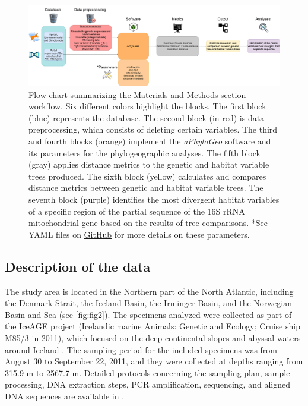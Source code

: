 \begin{figure}[htbp]
    \centering
    \includegraphics[width=\textwidth]{diagram.drawio.png}
    \caption{Flow chart summarizing the Materials and Methods section workflow. Six different colors highlight the blocks. The first block (blue) represents the database. The second block (in red) is data preprocessing, which consists of deleting certain variables. The third and fourth blocks (orange) implement the \textit{aPhyloGeo} software and its parameters for the phylogeographic analyses. The fifth block (gray) applies distance metrics to the genetic and habitat variable trees produced. The sixth block (yellow) calculates and compares distance metrics between genetic and habitat variable trees. The seventh block (purple) identifies the most divergent habitat variables of a specific region of the partial sequence of the 16S rRNA mitochondrial gene based on the results of tree comparisons. *See YAML files on \href{https://github.com/tahiri-lab/aPhyloGeo}{GitHub} for more details on these parameters. \label{fig:fig1}}
\end{figure}

\subsection{Description of the data}
The study area is located in the Northern part of the North Atlantic, including the Denmark Strait, the Iceland Basin, the Irminger Basin, and the Norwegian Basin and Sea (see \autoref{fig:fig2}). The specimens analyzed were collected as part of the IceAGE project (Icelandic marine Animals: Genetic and Ecology; Cruise ship M85/3 in 2011), which focused on the deep continental slopes and abyssal waters around Iceland \citep{meisner_prefacebiodiversity_2018}. The sampling period for the included specimens was from August 30 to September 22, 2011, and they were collected at depths ranging from 315.9 m to 2567.7 m. Detailed protocols concerning the sampling plan, sample processing, DNA extraction steps, PCR amplification, sequencing, and aligned DNA sequences are available in \citep{uhlir_adding_2021}.

